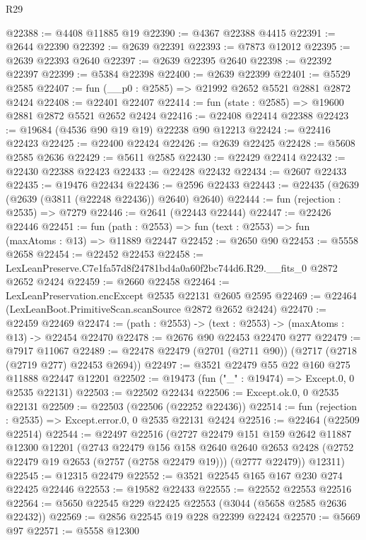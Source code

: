 \begin{lexlean}{R29}
\begin{coremodule}
@22388 := @4408 @11885 @19
@22390 := @4367 @22388 @4415
@22391 := @2644 @22390
@22392 := @2639 @22391
@22393 := @7873 @12012
@22395 := @2639 @22393 @2640
@22397 := @2639 @22395 @2640
@22398 := @22392 @22397
@22399 := @5384 @22398
@22400 := @2639 @22399
@22401 := @5529 @2585
@22407 := fun (__p0 : @2585) => @21992 @2652 @5521 @2881 @2872 @2424
@22408 := @22401 @22407
@22414 := fun (state : @2585) => @19600 @2881 @2872 @5521 @2652 @2424
@22416 := @22408 @22414 @22388
@22423 := @19684 (@4536 @90 @19 @19) @22238 @90 @12213
@22424 := @22416 @22423
@22425 := @22400 @22424
@22426 := @2639 @22425
@22428 := @5608 @2585 @2636
@22429 := @5611 @2585
@22430 := @22429 @22414
@22432 := @22430 @22388 @22423
@22433 := @22428 @22432
@22434 := @2607 @22433
@22435 := @19476 @22434
@22436 := @2596 @22433
@22443 := @22435 (@2639 (@2639 (@3811 (@22248 @22436)) @2640) @2640)
@22444 := fun (rejection : @2535) => @7279
@22446 := @2641 (@22443 @22444)
@22447 := @22426 @22446
@22451 := fun (path : @2553) => fun (text : @2553) => fun (maxAtoms : @13) => @11889 @22447
@22452 := @2650 @90
@22453 := @5558 @2658
@22454 := @22452 @22453
@22458 := LexLeanPreserve.C7e1fa57d8f24781bd4a0a60f2bc744d6.R29.__fits_0 @2872 @2652 @2424
@22459 := @2660 @22458
@22464 := LexLeanPreservation.encExcept @2535 @22131 @2605 @2595
@22469 := @22464 (LexLeanBoot.PrimitiveScan.scanSource @2872 @2652 @2424)
@22470 := @22459 @22469
@22474 := (path : @2553) -> (text : @2553) -> (maxAtoms : @13) -> @22454 @22470
@22478 := @2676 @90 @22453 @22470 @277
@22479 := @7917 @11067
@22489 := @22478 @22479 (@2701 (@2711 @90)) (@2717 (@2718 (@2719 @277) @22453 @2694))
@22497 := @3521 @22479 @55 @22 @160 @275 @11888 @22447 @12201
@22502 := @19473 (fun ("_" : @19474) => Except.{0, 0} @2535 @22131)
@22503 := @22502 @22434
@22506 := Except.ok.{0, 0} @2535 @22131
@22509 := @22503 (@22506 (@22252 @22436))
@22514 := fun (rejection : @2535) => Except.error.{0, 0} @2535 @22131 @2424
@22516 := @22464 (@22509 @22514)
@22544 := @22497
    @22516
    (@2727
      @22479
      @151
      @159
      @2642
      @11887
      @12300
      @12201
      (@2743
        @22479
        @156
        @158
        @2640
        @2640
        @2653
        @2428
        (@2752 @22479 @19 @2653 (@2757 (@2758 @22479 @19)))
        (@2777 @22479))
      @12311)
@22545 := @12315 @22479
@22552 := @3521 @22545 @165 @167 @230 @274 @22425 @22446
@22553 := @19582 @22433
@22555 := @22552 @22553 @22516
@22564 := @5650 @22545 @229 @22425 @22553 (@3044 (@5658 @2585 @2636 @22432))
@22569 := @2856 @22545 @19 @228 @22399 @22424
@22570 := @5669 @97
@22571 := @5558 @12300

\end{coremodule}
\end{lexlean}
